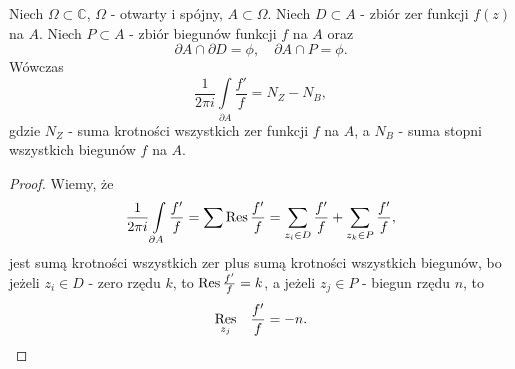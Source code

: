 \documentclass[../main.tex]{subfiles}
\begin{document}
\begin{tw}
    Niech $\Omega\subset\mathbb{C}$, $\Omega$ - otwarty i spójny, $A\subset\Omega$. Niech $D\subset A$ - zbiór zer funkcji $f(z)$ na $A$. Niech $P\subset A$ - zbiór biegunów funkcji $f$ na $A$ oraz
    \[
    \partial A \cap \partial D = \phi,\quad \partial A \cap P = \phi
    .\]
Wówczas
\[
    \frac{1}{2\pi i }\int\limits_{\partial A} \frac{f'}{f} = N_Z - N_B
,\]
gdzie $N_Z$ - suma krotności wszystkich zer funkcji $f$ na $A$, a $N_B$ - suma stopni wszystkich biegunów $f$ na $A$.
\end{tw}
\begin{proof}
    Wiemy, że
    \[
        \frac{1}{2\pi i}\int\limits_{\partial A}\frac{f'}{f} = \sum \operatorname{Res} \frac{f'}{f} = \sum_{z_i \in D} \frac{f'}{f} + \sum_{z_k\in P} \frac{f'}{f}
    ,\]
jest sumą krotności wszystkich zer plus sumą krotności wszystkich biegunów, bo jeżeli $z_i\in D$ - zero rzędu $k$, to $\operatorname{Res} \frac{f'}{f} = k$, a jeżeli $z_j\in P$ - biegun rzędu $n$, to
    \[
        \underset{z_j}{\operatorname{Res}}\quad \frac{f'}{f} = -n
    .\]
\end{proof}
\end{document}
